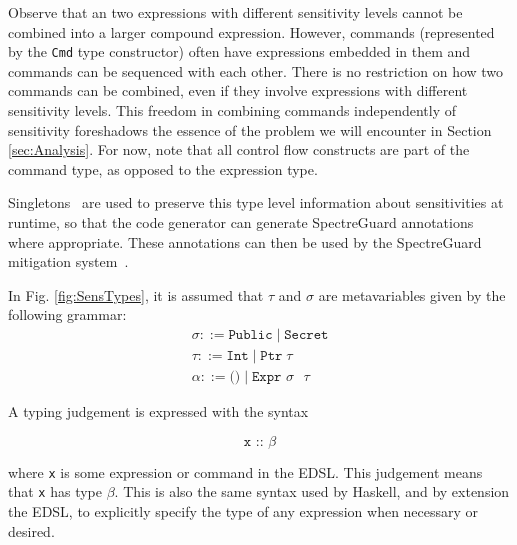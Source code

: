 \documentclass[10pt, conference]{IEEEtran}
\newcommand{\ttt}{\texttt}
\begin{document}
Observe that an two expressions with different sensitivity levels cannot be
combined into a larger compound expression. However, commands (represented by
the \verb|Cmd| type constructor) often have expressions embedded in them and
commands can be sequenced with each other.  There is no restriction on how two
commands can be combined, even if they involve expressions with different
sensitivity levels. This freedom in combining commands independently of
sensitivity foreshadows the essence of the problem we will encounter in
Section \ref{sec:Analysis}. For now, note that all control flow constructs are
part of the command type, as opposed to the expression type.

Singletons~\cite{Singletons} are used to preserve this type level information about sensitivities at runtime, so that the
code generator can generate SpectreGuard annotations where appropriate. These annotations can
then be used by the SpectreGuard mitigation system~\cite{SpectreGuard}.

In Fig. \ref{fig:SensTypes}, it is assumed that $\tau$ and $\sigma$ are metavariables given by the
following grammar:
\begin{gather*}
  \sigma ::= \ttt{Public}\;|\;\ttt{Secret}\\
  \tau ::= \ttt{Int}\;|\;\ttt{Ptr}\;\tau\\
  \alpha ::= \ttt{()}\;|\;\ttt{Expr $\sigma$ $\tau$}
\end{gather*}

\noindent A typing judgement is expressed with the syntax

\begin{equation*}
  \ttt{x :: $\beta$}
\end{equation*}

\noindent where \ttt{x} is some expression or command in the EDSL. This judgement means
that \ttt{x} has type $\beta$. This is also the same syntax used by Haskell, and by extension
the EDSL, to explicitly specify the type of any expression when necessary or desired.
\end{document}
